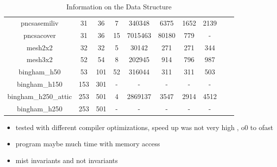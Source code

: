 \begin{table}[h]
{\begin{tabular}{c c c c c c c c c c}
        pncsasemiliv & 31 & 36 & 7 & 340348 & 6375 & 1652 & 2139 \\
        pncsacover & 31 & 36 & 15 & 7015463 & 80180 & 779 & - \\
        mesh2x2 & 32 & 32 & 5 & 30142 & 271 & 271 & 344 \\
        mesh3x2 & 52 & 54 & 8 & 202945 & 914 & 796 & 987 \\
        bingham\_h50 & 53 & 101 & 52 & 316044 & 311 & 311 & 503 \\
        bingham\_h150 & 153 & 301 & - & - & - & - & - \\
        bingham\_h250\_attic & 253 & 501 & 4 & 2869137 & 3547 & 2914 & 4512 \\
        bingham\_h250 & 253 & 501 & - & - & - & - & - \\
        \bottomrule
\end{tabular}%
}
\caption{Information on the Data Structure}
\label{tab:mist-results-datastruct}
\end{table}




\begin{itemize}
\item tested with different compiler optimizations, speed up was not very high , o0 to ofast 
\item program maybe much time with memory access 
\item mist invariants and not invariants
\end{itemize}


